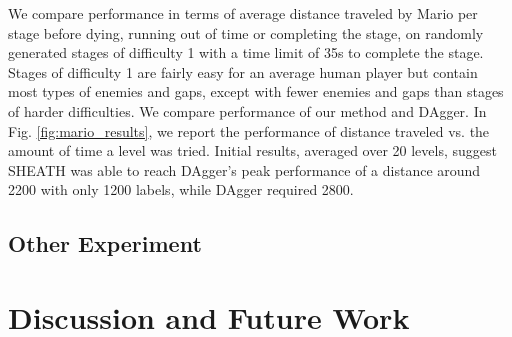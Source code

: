 \documentclass[10pt, conference]{ieeeconf}      %
\begin{document}
We compare performance in terms of average distance traveled by Mario per stage before dying, running out of time or completing the stage, on randomly generated stages of difficulty 1 with a time limit of 35s to complete the stage.  Stages of difficulty 1 are fairly easy for an average human player but contain most types of enemies and gaps, except with fewer enemies and gaps than stages of harder difficulties. We compare performance of our method and DAgger. In Fig. \ref{fig:mario_results}, we report the performance of distance traveled vs. the amount of time a level was tried.  Initial results, averaged over 20 levels,  suggest SHEATH was able to reach DAgger's peak performance of a distance around 2200 with only 1200 labels, while DAgger required 2800.  



\subsection{Other Experiment}


\section{Discussion and Future Work}




\end{document}
